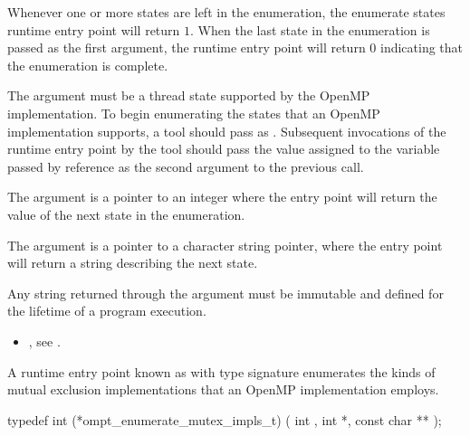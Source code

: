 Whenever one or more states are left in the enumeration,
the enumerate states runtime entry point will return $1$.
When the last state in the enumeration is passed
as the first argument, the runtime entry point will return $0$
indicating that the enumeration is complete.



\argdesc

The argument  must be a thread state
supported by the OpenMP implementation.  To begin enumerating the
states that an OpenMP implementation supports, a tool should pass
 as .  Subsequent
invocations of the runtime entry point by the tool should pass the
value assigned to the variable passed by reference as the second
argument to the previous call.

The argument  is a pointer to an integer where
the entry point will return the value of the next state in the
enumeration.

The argument  is a pointer to a
character string pointer, where the entry point will return a string
describing the next state.

\constraints
Any string returned through the argument
 must be immutable and defined
for the lifetime of a program execution.

\crossreferences
\begin{itemize}
\item {}, see .
\end{itemize}

\label{sec:ompt_enumerate_mutex_impls_t}
\label{sec:ompt_enumerate_mutex_impls}
\label{sec:ompt_mutex_impl_none}

\summary

A runtime entry point known as 
with type signature 
enumerates the kinds of mutual exclusion implementations that
an OpenMP implementation employs.


\format


\begin{ccppspecific}
\begin{omptInquiry}
typedef int (*ompt_enumerate_mutex_impls_t) (
  int ,
  int *,
  const char **
);
\end{omptInquiry}
\end{ccppspecific}

